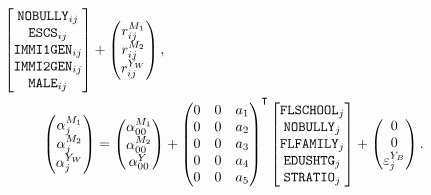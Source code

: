 \documentclass[a4paper,11pt,UKenglish,twoside,openright]{report}\usepackage[]{graphicx}\usepackage[]{color}
\begin{document}
\begin{equation}
\begin{aligned}
\begin{bmatrix}
            \texttt{NOBULLY}_{ij}\\
            \texttt{ESCS}_{ij}\\
            \texttt{IMMI1GEN}_{ij}\\
            \texttt{IMMI2GEN}_{ij}\\
            \texttt{MALE}_{ij}
        \end{bmatrix} +
        \begin{pmatrix}
            r^{M_1}_{ij}\\
            r^{M_2}_{ij}\\
            r^{Y_W}_{ij}
        \end{pmatrix},\\
        \begin{pmatrix}
            \alpha^{M_1}_{j}\\
            \alpha^{M_2}_{j}\\
            \alpha^{Y_W}_{j}\\
        \end{pmatrix} =
        \begin{pmatrix}
            \alpha^{M_1}_{00}\\
            \alpha^{M_2}_{00}\\
            \alpha^Y_{00}
        \end{pmatrix} &+
        \begin{pmatrix}
            0   &0  &a_1\\
            0   &0  &a_2\\
            0   &0  &a_3\\
            0   &0  &a_4\\
            0   &0  &a_5
        \end{pmatrix}\Ts
        \begin{bmatrix}
            \texttt{FLSCHOOL}_j\\
            \texttt{NOBULLY}_j\\
            \texttt{FLFAMILY}_j\\
            \texttt{EDUSHTG}_j\\
            \texttt{STRATIO}_j
        \end{bmatrix} +
        \begin{pmatrix}
            0\\
            0\\
            \epsilon^{Y_B}_j
        \end{pmatrix}.
    \end{aligned}
\end{equation}
\end{document}
